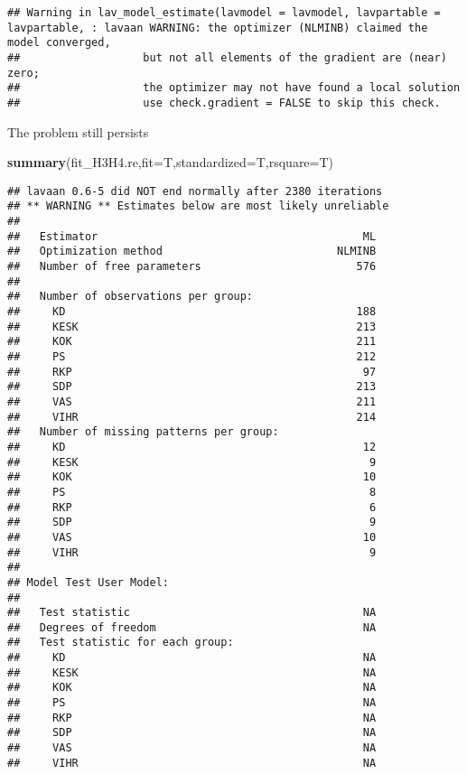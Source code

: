 \documentclass[
]{article}
\newenvironment{Shaded}{\begin{snugshade}}{\end{snugshade}}
\newcommand{\DataTypeTok}[1]{\textcolor[rgb]{0.13,0.29,0.53}{#1}}
\newcommand{\KeywordTok}[1]{\textcolor[rgb]{0.13,0.29,0.53}{\textbf{#1}}}
\newcommand{\NormalTok}[1]{#1}
\begin{document}
\begin{verbatim}
## Warning in lav_model_estimate(lavmodel = lavmodel, lavpartable = lavpartable, : lavaan WARNING: the optimizer (NLMINB) claimed the model converged,
##                   but not all elements of the gradient are (near) zero;
##                   the optimizer may not have found a local solution
##                   use check.gradient = FALSE to skip this check.
\end{verbatim}

The problem still persists

\begin{Shaded}
\begin{Highlighting}[]
\KeywordTok{summary}\NormalTok{(fit_H3H4.re,}\DataTypeTok{fit=}\NormalTok{T,}\DataTypeTok{standardized=}\NormalTok{T,}\DataTypeTok{rsquare=}\NormalTok{T)}
\end{Highlighting}
\end{Shaded}

\begin{verbatim}
## lavaan 0.6-5 did NOT end normally after 2380 iterations
## ** WARNING ** Estimates below are most likely unreliable
## 
##   Estimator                                         ML
##   Optimization method                           NLMINB
##   Number of free parameters                        576
##                                                       
##   Number of observations per group:                   
##     KD                                             188
##     KESK                                           213
##     KOK                                            211
##     PS                                             212
##     RKP                                             97
##     SDP                                            213
##     VAS                                            211
##     VIHR                                           214
##   Number of missing patterns per group:               
##     KD                                              12
##     KESK                                             9
##     KOK                                             10
##     PS                                               8
##     RKP                                              6
##     SDP                                              9
##     VAS                                             10
##     VIHR                                             9
##                                                       
## Model Test User Model:
##                                                       
##   Test statistic                                    NA
##   Degrees of freedom                                NA
##   Test statistic for each group:
##     KD                                              NA
##     KESK                                            NA
##     KOK                                             NA
##     PS                                              NA
##     RKP                                             NA
##     SDP                                             NA
##     VAS                                             NA
##     VIHR                                            NA
\end{verbatim}
\end{document}
